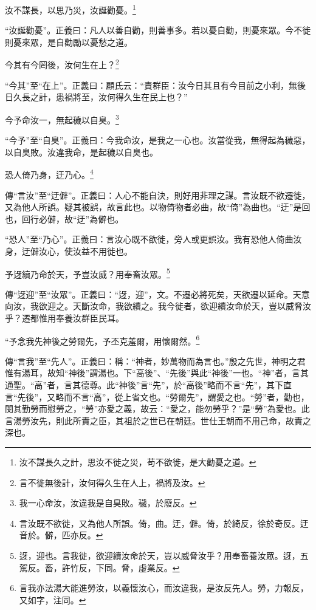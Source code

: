 汝不謀長，以思乃災，汝誕勸憂。\footnote{汝不謀長久之計，思汝不徙之災，苟不欲徙，是大勸憂之道。}

{\noindent\shu{}\fzkt “汝誕勸憂”。正義曰：凡人以善自勸，則善事多。若以憂自勸，則憂來眾。今不徙則憂來眾，是自勸勵以憂愁之道。 \par}

今其有今罔後，汝何生在上？\footnote{言不徙無後計，汝何得久生在人上，禍將及汝。}

{\noindent\shu{}\fzkt “今其”至“在上”。正義曰：顧氏云：“責群臣：汝今日其且有今目前之小利，無後日久長之計，患禍將至，汝何得久生在民上也？” \par}

今予命汝一，無起穢以自臭。\footnote{我一心命汝，汝違我是自臭敗。穢，於廢反。}

{\noindent\shu{}\fzkt “今予”至“自臭”。正義曰：今我命汝，是我之一心也。汝當從我，無得起為穢惡，以自臭敗。汝違我命，是起穢以自臭也。 \par}

恐人倚乃身，迂乃心。\footnote{言汝既不欲徙，又為他人所誤。倚，曲。迂，僻。倚，於綺反，徐於奇反。迂音於。僻，匹亦反。}

{\noindent\zhuan{}\fzbyks 傳“言汝”至“迂僻”。正義曰：人心不能自決，則好用非理之謀。言汝既不欲遷徙，又為他人所誤。疑其被誤，故言此也。以物倚物者必曲，故“倚”為曲也。“迂”是回也，回行必僻，故“迂”為僻也。 \par}

{\noindent\shu{}\fzkt “恐人”至“乃心”。正義曰：言汝心既不欲徙，旁人或更誤汝。我有恐他人倚曲汝身，迂僻汝心，使汝益不用徙也。 \par}

予迓續乃命於天，予豈汝威？用奉畜汝眾。\footnote{迓，迎也。言我徙，欲迎續汝命於天，豈以威脅汝乎？用奉畜養汝眾。迓，五駕反。畜，許竹反，下同。脅，虛業反。}

{\noindent\zhuan{}\fzbyks 傳“迓迎”至“汝眾”。正義曰：“迓，迎”，文。不遷必將死矣，天欲遷以延命。天意向汝，我欲迎之。天斷汝命，我欲續之。我今徙者，欲迎續汝命於天，豈以威脅汝乎？遷都惟用奉養汝群臣民耳。 \par}

“予念我先神後之勞爾先，予丕克羞爾，用懷爾然。\footnote{言我亦法湯大能進勞汝，以義懷汝心，而汝違我，是汝反先人。勞，力報反，又如字，注同。}

{\noindent\zhuan{}\fzbyks 傳“言我”至“先人”。正義曰：稱：“神者，妙萬物而為言也。”殷之先世，神明之君惟有湯耳，故知“神後”謂湯也。下“高後”、“先後”與此“神後”一也。“神”者，言其通聖。“高”者，言其德尊。此“神後”言“先”，於“高後”略而不言“先”，其下直言“先後”，又略而不言“高”，從上省文也。“勞爾先”，謂愛之也。“勞”者，勤也，閔其勤勞而慰勞之，“勞”亦愛之義，故云：“愛之，能勿勞乎？”是“勞”為愛也。此言湯勞汝先，則此所責之臣，其祖於之世已在朝廷。世仕王朝而不用己命，故責之深也。 \par}

